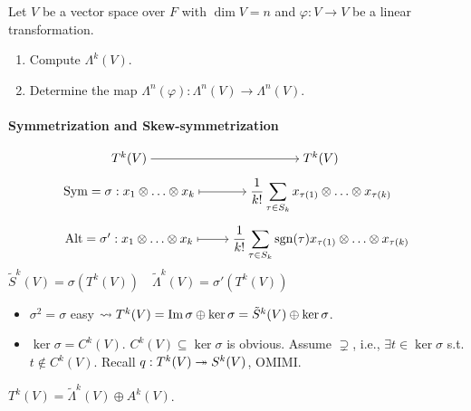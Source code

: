 \begin{exercise}
  Let $V$ be a vector space over $F$ with $\dim V = n$ and $\varphi: V\to V$
  be a linear transformation.
  \begin{enumerate}[(1)]
    \item Compute $\Lambda^k(V)$.
    \item Determine the map $\Lambda^n(\varphi): \Lambda^n(V)\to \Lambda^n(V)$.
  \end{enumerate}
\end{exercise}

\paragraph{Symmetrization and Skew-symmetrization}
\[
  \begin{tikzcd}[cramped, row sep=tiny]
    T^k(V) \arrow[r] & T^k(V) \\
    \Sym = \sigma: x_1\Ot \dots \Ot x_k \arrow[r, mapsto]
    & \displaystyle \frac{1}{k!}\sum_{\tau \in S_k}
    x_{\tau(1)}\Ot \dots \Ot x_{\tau(k)} \\
    \Alt = \sigma': x_1\Ot \dots \Ot x_k \arrow[r, mapsto]
    & \displaystyle \frac{1}{k!}\sum_{\tau \in S_k} \sgn(\tau)
    x_{\tau(1)}\Ot \dots \Ot x_{\tau(k)}
  \end{tikzcd}
\]
$\tilde{S}^k(V) = \sigma(T^k(V)) \quad \tilde{\Lambda}^k(V) = \sigma'(T^k(V))$

\begin{itemize}
  \item $\sigma^2 = \sigma$ easy $\leadsto T^k(V) = \operatorname{Im} \sigma \oplus
    \ker \sigma = \tilde{S}^k(V) \oplus \ker \sigma$.
  \item $\ker \sigma = C^k(V)$.
    $C^k(V) \subseteq \ker \sigma$ is obvious.
    Assume $\supsetneq$, i.e., $\exists t \in \ker \sigma$ s.t.
    $t \not\in C^k(V)$.
    Recall $q: T^k(V) \twoheadrightarrow S^k(V)$, OMIMI.
\end{itemize}

\begin{exercise}
  $T^k(V) = \tilde{\Lambda}^k(V) \oplus A^k(V)$.
\end{exercise}

